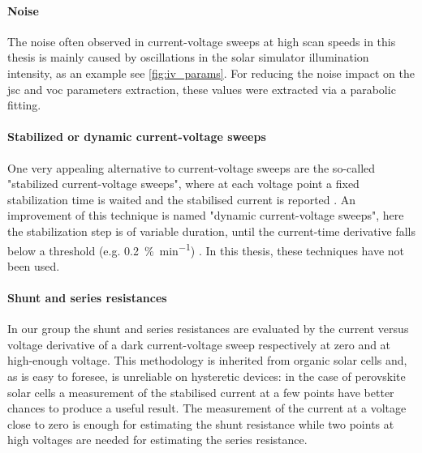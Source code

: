 	\paragraph{Noise} The noise often observed in current-voltage sweeps at high scan speeds in this thesis is mainly caused by oscillations in the solar simulator illumination intensity, as an example see \cref{fig:iv_params}. For reducing the noise impact on the \gls{jsc} and \gls{voc} parameters extraction, these values were extracted via a parabolic fitting. %

	\paragraph{Stabilized or dynamic current-voltage sweeps} One very appealing alternative to current-voltage sweeps are the so-called "stabilized current-voltage sweeps", where at each voltage point a fixed stabilization time is waited and the stabilised current is reported \cite{Unger2014, Christoforo2015}.
	An improvement of this technique is named "dynamic current-voltage sweeps", here the stabilization step is of variable duration, until the current-time derivative falls below a threshold (e.g. \SI{0.2}{\%\per\minute}) \cite{Dunbar2017,Dunbar2017a}.
	In this thesis, these techniques have not been used.

	\paragraph{Shunt and series resistances} \label{resistances} In our group the shunt and series resistances are evaluated by the current versus voltage derivative of a dark current-voltage sweep respectively at zero and at high-enough voltage. This methodology is inherited from organic solar cells and, as is easy to foresee, is unreliable on hysteretic devices: in the case of perovskite solar cells a measurement of the stabilised current at a few points have better chances to produce a useful result. The measurement of the current at a voltage close to zero is enough for estimating the shunt resistance while two points at high voltages are needed for estimating the series resistance.

